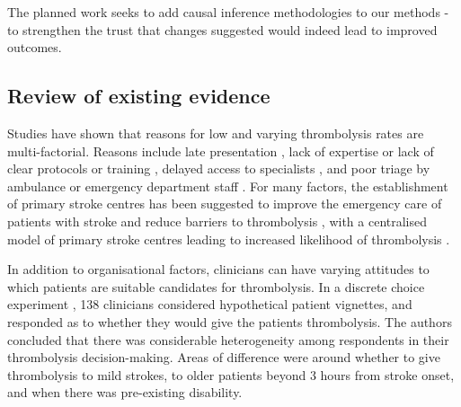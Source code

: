 The planned work seeks to add causal inference methodologies to our methods - to strengthen the trust that changes suggested would indeed lead to improved outcomes.

\subsection{Review of existing evidence}




Studies have shown that reasons for low and varying thrombolysis rates are multi-factorial. Reasons include late presentation \cite{aguiar_de_sousa_access_2019}, lack of expertise \cite{aguiar_de_sousa_access_2019} or lack of clear protocols or training \cite{carter-jones_stroke_2011}, delayed access to specialists \cite{kamal_delays_2017}, and poor triage by ambulance or emergency department staff \cite{carter-jones_stroke_2011}. For many factors, the establishment of primary stroke centres has been suggested to improve the emergency care of patients with stroke and reduce barriers to thrombolysis \cite{carter-jones_stroke_2011}, with a centralised model of primary stroke centres leading to increased likelihood of thrombolysis \cite{lahr_proportion_2012, morris_impact_2014, hunter_impact_2013}. 

In addition to organisational factors, clinicians can have varying attitudes to which patients are suitable candidates for thrombolysis. In a discrete choice experiment \cite{de_brun_factors_2018}, 138 clinicians considered hypothetical patient vignettes, and responded as to whether they would give the patients thrombolysis. The authors concluded that there was considerable heterogeneity among respondents in their thrombolysis decision-making. Areas of difference were around whether to give thrombolysis to mild strokes, to older patients beyond 3 hours from stroke onset, and when there was pre-existing disability.


